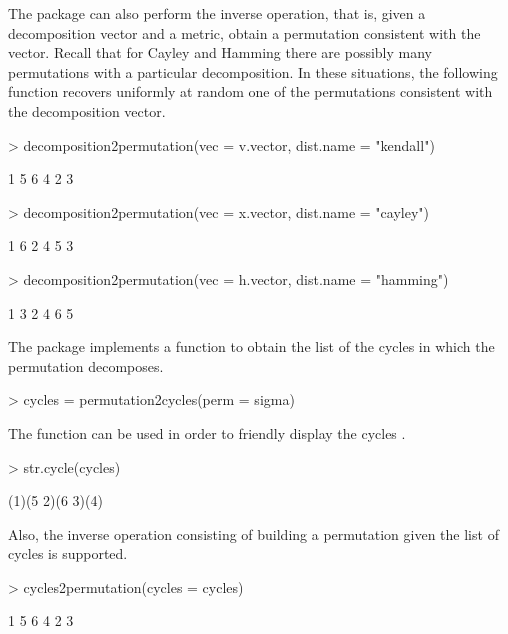 \documentclass[article,nojss]{jss}
\begin{document}
The  package can also perform the inverse operation, that is, given a decomposition vector and a metric, obtain a permutation consistent with the vector. Recall that for Cayley and Hamming there are possibly many permutations with a particular decomposition. In these situations, the following function recovers uniformly at random one of the permutations consistent with the decomposition vector.
\begin{Schunk}
\begin{Sinput}
> decomposition2permutation(vec = v.vector, dist.name = "kendall")
\end{Sinput}
\begin{Soutput}
[1] 1 5 6 4 2 3
\end{Soutput}
\begin{Sinput}
> decomposition2permutation(vec = x.vector, dist.name = "cayley")
\end{Sinput}
\begin{Soutput}
[1] 1 6 2 4 5 3
\end{Soutput}
\begin{Sinput}
> decomposition2permutation(vec = h.vector, dist.name = "hamming")
\end{Sinput}
\begin{Soutput}
[1] 1 3 2 4 6 5
\end{Soutput}
\end{Schunk}

The  package implements a function to obtain the list of the cycles in which the permutation decomposes. 
\begin{Schunk}
\begin{Sinput}
> cycles = permutation2cycles(perm = sigma)
\end{Sinput}
\end{Schunk}

The  function can be used in order to friendly display the cycles .
\begin{Schunk}
\begin{Sinput}
> str.cycle(cycles)
\end{Sinput}
\begin{Soutput}
(1)(5 2)(6 3)(4)
\end{Soutput}
\end{Schunk}

Also, the inverse operation consisting of building a permutation given the list of cycles is supported. 
\begin{Schunk}
\begin{Sinput}
> cycles2permutation(cycles = cycles)
\end{Sinput}
\begin{Soutput}
[1] 1 5 6 4 2 3
\end{Soutput}
\end{Schunk}
\end{document}
